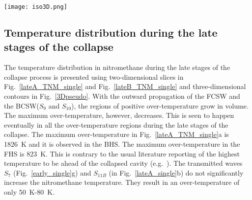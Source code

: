 \documentclass[3p,times,twocolumn]{elsarticle}
\begin{document}
\begin{figure*}[!ht]
\centering   
\texttt{[image: iso3D.png]}
\caption{Demonstration of over-temperature regions in 3D space. On the left side of each image is a colour plot of the total density field ($\rho$) on a plane through the centre of the cavity and projected backwards for illustration purposes. On each 2D plot, the black contour represents the cavity boundary ($z=0.5$) and the white contours ($T_{NM}=1264$) enclose the regions of (positive) over-temperature. On the right side of each image the three-dimensional cavity boundary is seen as a blue surface (contour $z=0.5$). The over-temperature regions are demonstrated only in one quadrant to aid visualisation, using an 3D isosurface of $T_{NM}=1264$. Note that the collapse process is shown here to move from bottom to top rather than left to right. The images here can be considered as rotated by 90-degrees counter-clockwise compared to Figs. \ref{early_single}-\ref{collapseTNM_single} and \ref{lateA_TNM_single}-\ref{lateB_TNM_single}. This is done solely for illustration purposes.}
\label{3Dpseudo}
\end{figure*}


\subsection{Temperature distribution during the late stages of the collapse}
The temperature distribution in nitromethane during the late stages of the
collapse process is presented using two-dimensional slices in Fig.\  \ref{lateA_TNM_single} and Fig.\
 \ref{lateB_TNM_single} and three-dimensional contours in Fig.\ \ref{3Dpseudo}.
With the outward propagation of the FCSW and the BCSW($S_9$ and $S_{10}$), the regions of positive over-temperature
grow in volume. The maximum over-temperature, however, decreases. This is
seen to happen eventually in all the over-temperature regions during the late
stages of the collapse. 
The maximum over-temperature in  Fig.\  \ref{lateA_TNM_single}a is \SI{1826}{\kelvin}
 and it is observed in the BHS. The  maximum over-temperature in the FHS
is \SI{823}{\kelvin}. This is contrary to the usual literature reporting of the highest temperature to be ahead of the collapsed cavity (e.g.\ \cite{bourne1992shock,bourne2002cavity,bourne2003temperature}).
The transmitted waves $S_7$ (Fig.\  \ref{early_single}g) and $S_{11B}$ (in Fig.\ \ref{lateA_single}b) do not significantly increase 
the nitromethane temperature. They result in an over-temperature of  only \SI{50}{\kelvin}-\SI{80}{\kelvin}.
\end{document}
